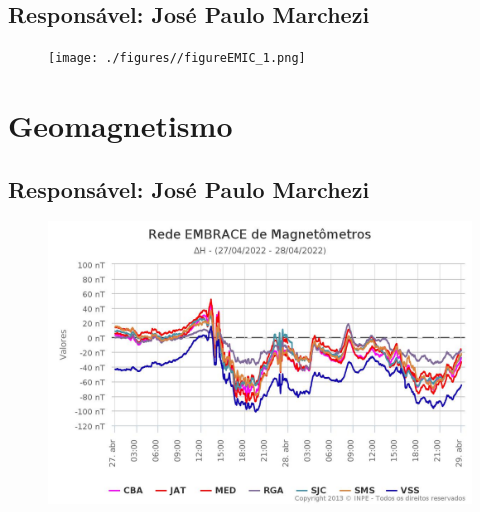 \documentclass[11pt, oneside]{article}
\begin{document}
 \subsection{Responsável: José Paulo Marchezi} 
 
\begin{figure}[H]
    
                        \centering
   
                             \texttt{[image: ./figures//figureEMIC\_1.png]}

                        \end{figure}

                     \section{Geomagnetismo} 
 \subsection{Responsável: José Paulo Marchezi} 
 
\begin{figure}[H]
    
                        \centering
   
                             \includegraphics[width=14cm]{./figures//figureGeomag_0.png}

                        \end{figure}
\end{document}

